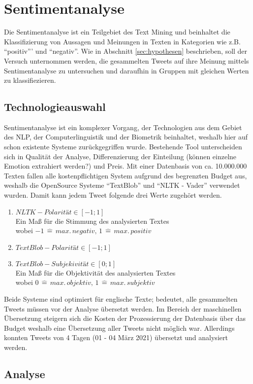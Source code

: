 \chapter{Sentimentanalyse}
\label{chap:sentiment}
Die Sentimentanalyse ist ein Teilgebiet des \gls{Text Mining} und beinhaltet die Klassifizierung von Aussagen und Meinungen in Texten in Kategorien wie z.B. "`positiv"'' und "`negativ"'. Wie in Abschnitt \ref{sec:hypothesen} beschrieben, soll der Versuch unternommen werden, die gesammelten Tweets auf ihre Meinung mittels Sentimentanalyse zu untersuchen und daraufhin in Gruppen mit gleichen Werten zu klassifiezieren. 
\section{Technologieauswahl}
Sentimentanalyse ist ein komplexer Vorgang, der Technologien aus dem Gebiet des \ac{NLP}, der Computerlinguistik und der Biometrik beinhaltet, weshalb hier auf schon existente Systeme zurückgegriffen wurde.
Bestehende Tool unterscheiden sich in Qualität der Analyse, Differenzierung der Einteilung (können einzelne Emotion extrahiert werden?) und Preis. 
Mit einer Datenbasis von ca. 10.000.000 Texten fallen alle kostenpflichtigen System aufgrund des begrenzten Budget aus, weshalb  die \gls{OpenSource} Systeme "`TextBlob"' und "`NLTK - Vader"' verwendet wurden. Damit kann jedem Tweet folgende drei Werte zugehört werden.
\begin{enumerate}
	\item $NLTK - Polarität \in [-1;1]$\\ Ein Maß für die Stimmung des analysierten Textes\\ wobei $-1\,\hat{=}\,max.\,negativ,\,1\,\hat{=} \,max.\,positiv$ 
	\item $TextBlob - Polarität \in [-1;1]$
	\item $TextBlob - Subjekivität \in [0;1]$\\ Ein Maß für die Objektivität des analysierten Textes\\ wobei $0\,\hat{=}\,max.\,objektiv,\,1\,\hat{=} \,max.\,subjektiv$ 
\end{enumerate}

Beide Systeme sind optimiert für englische Texte; bedeutet, alle gesammelten Tweets müssen vor der Analyse übersetzt werden. Im Bereich der maschinellen Übersetzung steigern sich die Kosten der Prozessierung der Datenbasis über das Budget weshalb eine Übersetzung aller Tweets nicht möglich war.
Allerdings konnten Tweets von 4 Tagen (01 - 04 März 2021) übersetzt und analysiert werden.

\section{Analyse}